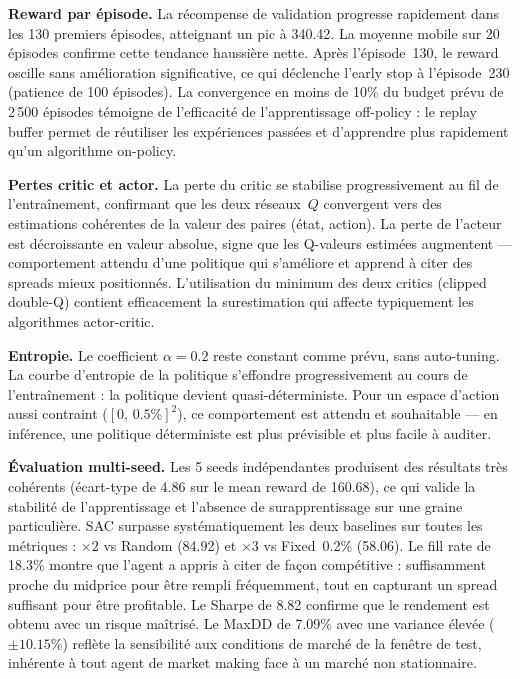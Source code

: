 \documentclass[11pt,a4paper]{article}
\begin{document}
\textbf{Reward par épisode.}
La récompense de validation progresse rapidement dans les
130 premiers épisodes, atteignant un pic à 340.42. La
moyenne mobile sur 20 épisodes confirme cette tendance
haussière nette. Après l'épisode~130, le reward oscille
sans amélioration significative, ce qui déclenche l'early
stop à l'épisode~230 (patience de 100 épisodes). La
convergence en moins de 10\% du budget prévu de
2\,500 épisodes témoigne de l'efficacité de l'apprentissage
off-policy : le replay buffer permet de réutiliser les
expériences passées et d'apprendre plus rapidement qu'un
algorithme on-policy.

\textbf{Pertes critic et actor.}
La perte du critic se stabilise progressivement au fil de
l'entraînement, confirmant que les deux réseaux~$Q$
convergent vers des estimations cohérentes de la valeur
des paires (état, action). La perte de l'acteur est
décroissante en valeur absolue, signe que les Q-valeurs
estimées augmentent — comportement attendu d'une politique
qui s'améliore et apprend à citer des spreads mieux
positionnés. L'utilisation du minimum des deux critics
(clipped double-Q) contient efficacement la surestimation
qui affecte typiquement les algorithmes actor-critic.

\textbf{Entropie.}
Le coefficient $\alpha = 0.2$ reste constant comme prévu,
sans auto-tuning. La courbe d'entropie de la politique
s'effondre progressivement au cours de l'entraînement :
la politique devient quasi-déterministe. Pour un espace
d'action aussi contraint ($[0,\,0.5\%]^2$), ce comportement
est attendu et souhaitable — en inférence, une politique
déterministe est plus prévisible et plus facile à auditer.

\textbf{Évaluation multi-seed.}
Les 5 seeds indépendantes produisent des résultats
très cohérents (écart-type de 4.86 sur le mean reward
de 160.68), ce qui valide la stabilité de l'apprentissage
et l'absence de surapprentissage sur une graine particulière.
SAC surpasse systématiquement les deux baselines sur toutes
les métriques : $\times 2$ vs Random (84.92) et $\times 3$
vs Fixed~0.2\% (58.06). Le fill rate de 18.3\% montre que
l'agent a appris à citer de façon compétitive : suffisamment
proche du midprice pour être rempli fréquemment, tout en
capturant un spread suffisant pour être profitable. Le
Sharpe de 8.82 confirme que le rendement est obtenu avec
un risque maîtrisé. Le MaxDD de 7.09\% avec une variance
élevée ($\pm 10.15\%$) reflète la sensibilité aux conditions
de marché de la fenêtre de test, inhérente à tout agent
de market making face à un marché non stationnaire.
\end{document}
